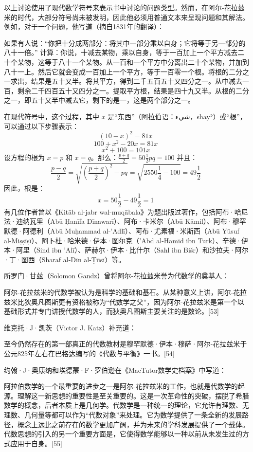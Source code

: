 以上讨论使用了现代数学符号来表示书中讨论的问题类型。然而，在阿尔-花拉兹米的时代，大部分符号尚未被发明，因此他必须用普通文本来呈现问题和其解法。例如，对于一个问题，他写道（摘自1831年的翻译）：

如果有人说：“你把十分成两部分：将其中一部分乘以自身；它将等于另一部分的八十一倍。” 计算：你说，十减去某物，乘以自身，等于一百加上一个平方减去二十个某物，这等于八十一个某物。从一百和一个平方中分离出二十个某物，并加到八十一上。然后它就会变成一百加上一个平方，等于一百零一个根。将根的二分之一求出，结果是五十又半。将其平方，得到二千五百五十又四分之一。从中减去一百，剩余二千四百五十又四分之一。提取平方根，结果是四十九又半。从根的二分之一，即五十又半中减去它，剩下的是一，这是两个部分之一。

在现代符号中，这个过程，其中 \(x\) 是“东西”（阿拉伯语：شيء，shayʾ）或“根”，可以通过以下步骤表示：
\[
(10 - x)^2 = 81x~
\]
\[
100 + x^2 - 20x = 81x~
\]
\[
x^2 + 100 = 101x~
\]
设方程的根为 \(x = p\) 和 \(x = q\)。那么：\(\frac{p + q}{2} = 50 \frac{1}{2}\)\(pq = 100\)
并且：
\[
\frac{p - q}{2} = \sqrt{\left(\frac{p + q}{2}\right)^2 - pq} = \sqrt{2550 \frac{1}{4} - 100} = 49 \frac{1}{2}~
\]
因此，根是：
\[
x = 50 \frac{1}{2} - 49 \frac{1}{2} = 1~
\]
有几位作者曾以《Kitāb al-jabr wal-muqābala》为题出版过著作，包括阿布·哈尼法·迪纳瓦里（Abū Ḥanīfa Dīnawarī）、阿布·卡米尔（Abū Kāmil）、阿布·穆罕默德·阿德利（Abū Muḥammad al-'Adlī）、阿布·尤素福·米斯西（Abū Yūsuf al-Miṣṣīṣī）、阿卜杜·哈米德·伊本·图尔克（'Abd al-Hamīd ibn Turk）、辛德·伊本·阿里（Sind ibn 'Alī）、萨赫尔·伊本·比什尔（Sahl ibn Bišr）和沙拉夫·阿尔·丁·图西（Sharaf al-Dīn al-Ṭūsī）等。

所罗门·甘兹（Solomon Gandz）曾将阿尔-花拉兹米誉为代数学的奠基人：

阿尔-花拉兹米的代数学被认为是科学的基础和基石。从某种意义上讲，阿尔-花拉兹米比狄奥凡图斯更有资格被称为“代数学之父”，因为阿尔-花拉兹米是第一个以基础形式并专门讲授代数学的人，而狄奥凡图斯主要关注的是数论。[53]

维克托·J·凯茨（Victor J. Katz）补充道：

至今仍然存在的第一部真正的代数教材是穆罕默德·伊本·穆萨·阿尔-花拉兹米于公元825年左右在巴格达编写的《代数与平衡》一书。[54]

约翰·J·奥康纳和埃德蒙·F·罗伯逊在《MacTutor数学史档案》中写道：

阿拉伯数学的一个最重要的进步之一是阿尔-花拉兹米的工作，也就是代数学的起源。理解这一新思想的重要性是至关重要的。这是一次革命性的突破，摆脱了希腊数学的概念，后者本质上是几何学。代数学是一种统一的理论，它允许有理数、无理数、几何量等都可以作为“代数对象”来处理。它为数学提供了一条全新的发展路径，概念上远比之前存在的数学更加广阔，并为未来的学科发展提供了一个载体。代数思想的引入的另一个重要方面是，它使得数学能够以一种以前从未发生过的方式应用于自身。[55]

